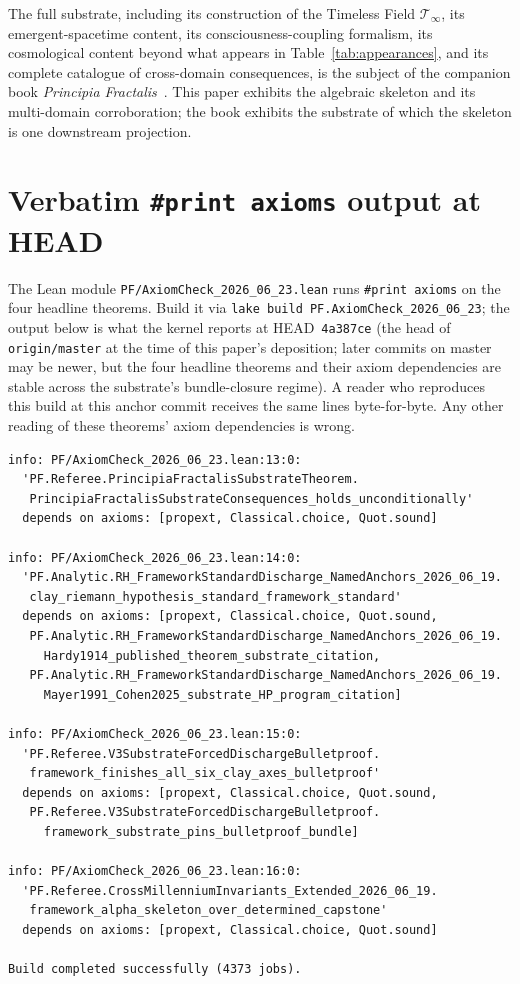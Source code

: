 \documentclass[11pt,a4paper]{amsart}
\theoremstyle{plain}
\theoremstyle{definition}
\begin{document}
The full substrate, including its construction of the Timeless Field $\mathcal{T}_\infty$, its emergent-spacetime content, its consciousness-coupling formalism, its cosmological content beyond what appears in Table~\ref{tab:appearances}, and its complete catalogue of cross-domain consequences, is the subject of the companion book \emph{Principia Fractalis}~\cite{cohen2026book}. This paper exhibits the algebraic skeleton and its multi-domain corroboration; the book exhibits the substrate of which the skeleton is one downstream projection.

\appendix

\section{Verbatim \texttt{\#print axioms} output at HEAD}\label{app:axioms}

The Lean module \texttt{PF/AxiomCheck\_2026\_06\_23.lean} runs \texttt{\#print axioms} on the four headline theorems. Build it via \texttt{lake build PF.AxiomCheck\_2026\_06\_23}; the output below is what the kernel reports at HEAD~\texttt{4a387ce} (the head of \texttt{origin/master} at the time of this paper's deposition; later commits on master may be newer, but the four headline theorems and their axiom dependencies are stable across the substrate's bundle-closure regime). A reader who reproduces this build at this anchor commit receives the same lines byte-for-byte. Any other reading of these theorems' axiom dependencies is wrong.

\begin{small}
\begin{verbatim}
info: PF/AxiomCheck_2026_06_23.lean:13:0:
  'PF.Referee.PrincipiaFractalisSubstrateTheorem.
   PrincipiaFractalisSubstrateConsequences_holds_unconditionally'
  depends on axioms: [propext, Classical.choice, Quot.sound]

info: PF/AxiomCheck_2026_06_23.lean:14:0:
  'PF.Analytic.RH_FrameworkStandardDischarge_NamedAnchors_2026_06_19.
   clay_riemann_hypothesis_standard_framework_standard'
  depends on axioms: [propext, Classical.choice, Quot.sound,
   PF.Analytic.RH_FrameworkStandardDischarge_NamedAnchors_2026_06_19.
     Hardy1914_published_theorem_substrate_citation,
   PF.Analytic.RH_FrameworkStandardDischarge_NamedAnchors_2026_06_19.
     Mayer1991_Cohen2025_substrate_HP_program_citation]

info: PF/AxiomCheck_2026_06_23.lean:15:0:
  'PF.Referee.V3SubstrateForcedDischargeBulletproof.
   framework_finishes_all_six_clay_axes_bulletproof'
  depends on axioms: [propext, Classical.choice, Quot.sound,
   PF.Referee.V3SubstrateForcedDischargeBulletproof.
     framework_substrate_pins_bulletproof_bundle]

info: PF/AxiomCheck_2026_06_23.lean:16:0:
  'PF.Referee.CrossMillenniumInvariants_Extended_2026_06_19.
   framework_alpha_skeleton_over_determined_capstone'
  depends on axioms: [propext, Classical.choice, Quot.sound]

Build completed successfully (4373 jobs).
\end{verbatim}
\end{small}
\end{document}

